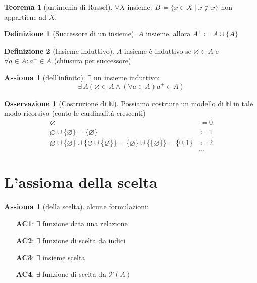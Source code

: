 \documentclass[a4paper,10pt]{article}
\theoremstyle{definition}
\newcommand{\na}{\mathbb{N}} %
\theoremstyle{indentdefinition}
\newtheorem{defn}{Definizione}[section]
\theoremstyle{indentpostulate}
\newtheorem{axiom}{Assioma}[section]
\newtheorem*{axiom*}{Assioma}
\theoremstyle{indenttheorem}
\newtheorem{thm}{Teorema}[section]
\theoremstyle{myremark}
\newtheorem*{rem*}{Osservazione}
\theoremstyle{indentgeneral}
\newenvironment{myboxed} 
{\noindent\begin{lrbox}{\mybox}\begin{minipage}{\textwidth}}
{\end{minipage}\end{lrbox}\fbox{\usebox{\mybox}}}
\begin{document}
\begin{thm}[antinomia di Russel]
    $\forall X$ insieme: $B\coloneqq\{x\in X\mid x\notin x\}$ non appartiene ad $X$.
\end{thm}

\begin{defn}[Successore di un insieme] $A$ insieme, allora $A^+\coloneqq A\cup \{A\}$
\end{defn}

\begin{defn}[Insieme induttivo]
    $A$ insieme è induttivo se $\varnothing\in A$ e $\forall a\in A: a^+\in A$ (chiusura per successore)
\end{defn}

\begin{axiom}[dell'infinito]
    $\exists$ un insieme induttivo:
    $$\exists\, A(\varnothing\in A\land (\forall a\in A) a^+\in A)$$
\end{axiom}

\begin{myboxed}
\begin{rem*}[Costruzione di $\na$] Possiamo costruire un modello di $\na$ in tale modo ricorsivo (conto le cardinalità crescenti)
\begin{align*}
    \varnothing &\coloneqq 0\\
    \varnothing \cup \{\varnothing\}=\{\varnothing\}&\coloneqq 1 \\
    \varnothing \cup \{\varnothing\}\cup\{\varnothing \cup \{\varnothing\}\}=\{\varnothing\}\cup\{\{\varnothing\}\}=\{0,1\}&\coloneqq2\\
    &\dots
\end{align*}
\end{rem*}
\end{myboxed}



\pagebreak{}
\section{L’assioma della scelta}
\begin{myboxed}
\begin{axiom*}[della scelta] alcune formulazioni:
\begin{itemize}
    \item[\textbf{AC1}:] $\exists$ funzione data una relazione
    \item[\textbf{AC2}:] $\exists$ funzione di scelta da indici
    \item[\textbf{AC3}:] $\exists$ insieme scelta
    \item[\textbf{AC4}:]$\exists$ funzione di scelta da $\mathscr{P}(A)$
\end{itemize}
\end{axiom*}
\end{myboxed}
\end{document}
